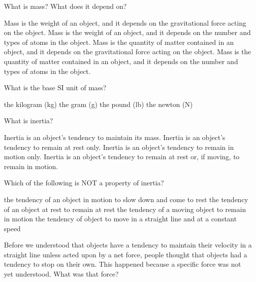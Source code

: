 \documentclass[]{exam}
\begin{document}

\begin{questions}

\question
What is mass? What does it depend on?

\begin{randomizechoices}
    \choice Mass is the weight of an object, and it depends on the gravitational force acting on the object.
    \choice Mass is the weight of an object, and it depends on the number and types of atoms in the object.
    \choice Mass is the quantity of matter contained in an object, and it depends on the gravitational force acting on the object.
    \correctchoice Mass is the quantity of matter contained in an object, and it depends on the number and types of atoms in the object.
\end{randomizechoices}


\question
What is the base SI unit of mass?

\begin{randomizechoices}
    \correctchoice the kilogram (kg)
    \choice the gram (g)
    \choice the pound (lb)
    \choice the newton (N)
\end{randomizechoices}

\question
What is inertia?

\begin{randomizechoices}
    \choice Inertia is an object’s tendency to maintain its mass.
    \choice Inertia is an object’s tendency to remain at rest only.
    \choice Inertia is an object’s tendency to remain in motion only.
    \correctchoice Inertia is an object’s tendency to remain at rest or, if moving, to remain in motion.
\end{randomizechoices}


\question
Which of the following is NOT a property of inertia?

\begin{randomizechoices}
    \correctchoice the tendency of an object in motion to slow down and come to rest
    \choice the tendency of an object at rest to remain at rest
    \choice the tendency of a moving object to remain in motion
    \choice the tendency of object to move in a straight line and at a constant speed
\end{randomizechoices}

\question
Before we understood that objects have a tendency to maintain their velocity in a straight line unless acted upon by a net force, people thought that objects had a tendency to stop on their own. This happened because a specific force was not yet understood. What was that force?


\end{questions}
\end{document}
